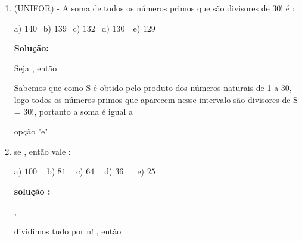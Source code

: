 \begin{multicols*}{2}
\begin{enumerate}
\begin{enumerate}
			            \\

			            \\

			            \\

			            \\


			      \item (UNIFOR) - A soma de todos os números primos que são divisores de 30! é :

			            a) $140 \ \ $ b) $139 \ \ $ c) $132 \ \ $ d) $130 \ \ \ $ e) $129 \ \ $

			            \textbf{Solução:}

			            Seja , então


			            Sabemos que como S é obtido pelo produto dos números naturais de 1 a 30, logo todos os números primos que aparecem nesse intervalo são divisores de S = 30!, portanto a soma  é igual a



			            opção "e"

			      \item se , então  vale :

			            a) $100 \ \ \ \ $ b) $81 \ \ \ \ $ c) $64 \ \ \ \ $ d) $36 \ \ \ \ \ \ $ e) $25 \ \ $

			            \textbf{solução :}


			            ,

			            dividimos tudo por n! , então



\end{enumerate}
\end{enumerate}
\end{multicols*}
